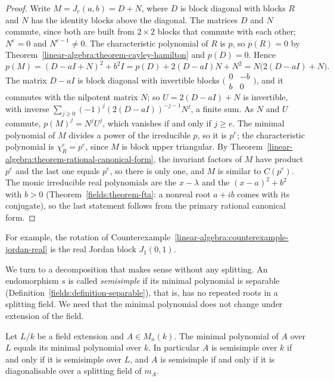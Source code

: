 \begin{proof}
Write $M = J_e(a, b) = D + N$, where $D$ is block diagonal with blocks $R$ and $N$ has the identity
blocks above the diagonal. The matrices $D$ and $N$ commute, since both are built from $2 \times 2$
blocks that commute with each other; $N^e = 0$ and $N^{e-1} \neq 0$. The characteristic polynomial of
$R$ is $p$, so $p(R) = 0$ by Theorem~\ref{linear-algebra:theorem-cayley-hamilton} and $p(D) = 0$. Hence
\[
p(M) = (D - aI + N)^2 + b^2I = p(D) + 2(D - aI)N + N^2 = N\bigl(2(D - aI) + N\bigr).
\]
The matrix $D - aI$ is block diagonal with invertible blocks $\bigl(\begin{smallmatrix} 0 & -b \\ b & 0\end{smallmatrix}\bigr)$,
and it commutes with the nilpotent matrix $N$; so $U = 2(D - aI) + N$ is invertible, with inverse
$\sum_{j \geq 0}(-1)^j(2(D - aI))^{-j-1}N^j$, a finite sum. As $N$ and $U$ commute,
$p(M)^j = N^jU^j$, which vanishes if and only if $j \geq e$. The minimal polynomial of $M$ divides
a power of the irreducible $p$, so it is $p^e$; the characteristic polynomial is $\chi_R^e = p^e$,
since $M$ is block upper triangular. By Theorem~\ref{linear-algebra:theorem-rational-canonical-form},
the invariant factors of $M$ have product $p^e$ and the last one equals $p^e$, so there is only one,
and $M$ is similar to $C(p^e)$. The monic irreducible real polynomials are the $x - \lambda$ and the
$(x - a)^2 + b^2$ with $b > 0$ (Theorem~\ref{fields:theorem-fta}: a nonreal root $a + ib$ comes with its
conjugate), so the last statement follows from the primary rational canonical form.
\end{proof}

For example, the rotation of Counterexample~\ref{linear-algebra:counterexample-jordan-real} is the real
Jordan block $J_1(0, 1)$.

We turn to a decomposition that makes sense without any splitting. An endomorphism $s$ is called
\emph{semisimple} if its minimal polynomial is separable (Definition~\ref{fields:definition-separable}),
that is, has no repeated roots in a splitting field. We need that the minimal polynomial does not
change under extension of the field.

\begin{lemma}\label{linear-algebra:lemma-minimal-polynomial-extension}
Let $L/k$ be a field extension and $A \in M_n(k)$. The minimal polynomial of $A$ over $L$ equals its
minimal polynomial over $k$. In particular $A$ is semisimple over $k$ if and only if it is semisimple
over $L$, and $A$ is semisimple if and only if it is diagonalisable over a splitting field of $m_A$.
\end{lemma}

